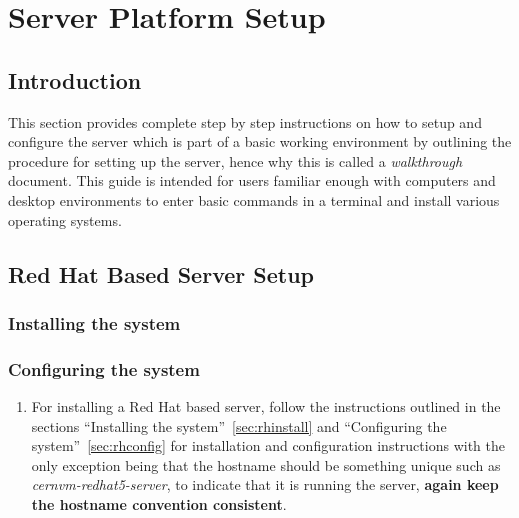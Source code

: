 \chapter{\cernvmreleasetesting Server Platform Setup}
\label{sec:serversetup}

\section{Introduction}
This section provides complete step by step instructions on how to setup and configure the \tapper server which is part of a basic 
working \releasetesting environment by outlining the procedure for setting up the server, hence why this is called a \emph{walkthrough} 
document. This guide is intended for users familiar enough with computers and desktop environments to enter basic commands in a terminal 
and install various operating systems. 

\section{Red Hat Based Server Setup}
\subsection{Installing the system}
\subsection{Configuring the system}
\flushleft
\begin{enumerate}
\item 	For installing a Red Hat based server, follow the instructions outlined in the sections ``Installing the 
		system''~\ref{sec:rhinstall} and ``Configuring the system''~\ref{sec:rhconfig} for installation and configuration 
		instructions with the only exception being that the hostname should be something unique such as \emph{cernvm-redhat5-server}, to 
		indicate that it is running the \tapper server, {\bf again keep the hostname convention consistent}.
\end{enumerate}

